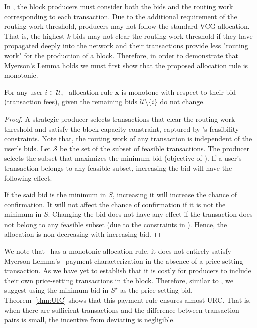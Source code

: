 In \ourTFM, the block producers must consider both the bids and the routing work corresponding to each transaction. Due to the additional requirement of the routing work threshold, producers may not follow the standard VCG allocation. That is, the highest $k$ bids may not clear the routing work threshold if they have propagated deeply into the network and their transactions provide less "routing work" for the production of a block. Therefore, in order to demonstrate that Myerson's Lemma holds we must first show that the proposed allocation rule is monotonic.

\begin{lemma}\label{lemma:monotone} 
    For any user $i\in \mathcal{U}$, \ourTFM\ allocation rule $\bm{x}$ is monotone with respect to their bid (transaction fees), given the remaining bids $\mathcal{U}\setminus \{i\}$ do not change. 
\end{lemma}
\begin{proof}

A strategic producer selects transactions that clear the routing work threshold and satisfy the block capacity constraint, captured by \ourOPT's feasibility constraints. Note that, the routing work of any transaction is independent of the user's bids. Let $\mathcal{S}$ be the set of the subset of feasible transactions. The producer selects the subset that maximizes the minimum bid (objective of \ourOPT). If a user's transaction belongs to any feasible subset, increasing the bid will have the following effect. 

If the said bid is the minimum in $S$, increasing it will increase the chance of confirmation. It will not affect the chance of confirmation if it is not the minimum in $S$. Changing the bid does not have any effect if the transaction does not belong to any feasible subset (due to the constraints in \ourOPT). Hence, the allocation is non-decreasing with increasing bid.
\end{proof}

We note that \ourTFM\ has a monotonic allocation rule, it does not entirely satisfy Myerson Lemma's~\cite{myerson81} payment characterization in the absence of a price-setting transaction. As we have yet to establish that it is costly for producers to include their own price-setting transactions in the block. Therefore, similar to \citet{roughgarden2021}, we suggest using the minimum bid in $S^\star$ as the price-setting bid. Theorem~\ref{thm:UIC} shows that this payment rule ensures almost URC. That is, when there are sufficient transactions and the difference between transaction pairs is small, the incentive from deviating is negligible.

